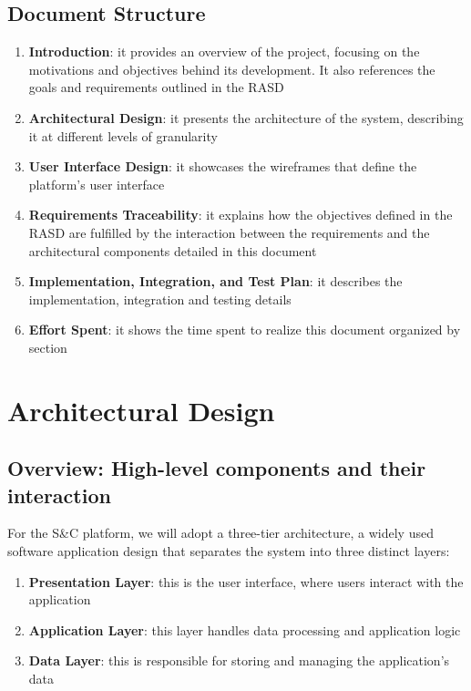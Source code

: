 \section{Document Structure}
\begin{enumerate}
    \item \textbf{Introduction}: it provides an overview of the project, focusing on the motivations and objectives behind its development. It also references the goals and requirements outlined in the RASD
    \item \textbf{Architectural Design}: it presents the architecture of the system, describing it at different levels of granularity
    \item \textbf{User Interface Design}: it showcases the wireframes that define the platform's user interface
    \item \textbf{Requirements Traceability}: it explains how the objectives defined in the RASD are fulfilled by the interaction between the requirements and the architectural components detailed in this document
    \item \textbf{Implementation, Integration, and Test Plan}: it describes the implementation, integration and testing details
     \item \textbf{Effort Spent}: it shows the time spent to realize this document organized by section
\end{enumerate}


\chapter{Architectural Design}
\label{Architectural Design}

\section{Overview: High-level components and their interaction}
For the S\&C platform, we will adopt a three-tier architecture, a widely used software application design that separates the system into three distinct layers:  
\begin{enumerate}
    \item \textbf{Presentation Layer}: this is the user interface, where users interact with the application
    \item \textbf{Application Layer}: this layer handles data processing and application logic
    \item \textbf{Data Layer}: this is responsible for storing and managing the application's data
\end{enumerate}

